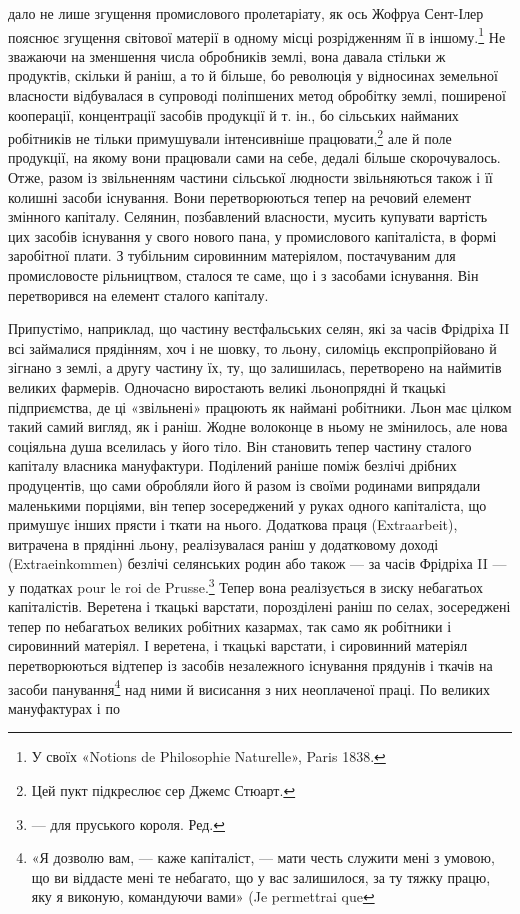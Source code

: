 \parcont{}  %
дало не лише згущення промислового пролетаріату, як ось Жофруа
Сент-Ілер пояснює згущення світової матерії в одному
місці розрідженням її в іншому.\footnote{
У своїх «Notions de Philosophie Naturelle», Paris 1838.
} Не зважаючи на зменшення
числа обробників землі, вона давала стільки ж продуктів, скільки
й раніш, а то й більше, бо революція у відносинах земельної
власности відбувалася в супроводі поліпшених метод обробітку
землі, поширеної кооперації, концентрації засобів продукції й
т. ін., бо сільських найманих робітників не тільки примушували
інтенсивніше працювати,\footnote{
Цей пукт підкреслює сер Джемс Стюарт.
} але й поле продукції, на якому
вони працювали сами на себе, дедалі більше скорочувалось.
Отже, разом із звільненням частини сільської людности звільняються
також і її колишні засоби існування. Вони перетворюються
тепер на речовий елемент змінного капіталу. Селянин,
позбавлений власности, мусить купувати вартість цих засобів
існування у свого нового пана, у промислового капіталіста, в
формі заробітної плати. З тубільним сировинним матеріялом,
постачуваним для промисловосте рільництвом, сталося те саме,
що і з засобами існування. Він перетворився на елемент сталого
капіталу.

Припустімо, наприклад, що частину вестфальських селян,
які за часів Фрідріха II всі займалися прядінням, хоч і не шовку,
то льону, силоміць експропрійовано й зігнано з землі, а другу
частину їх, ту, що залишилась, перетворено на наймитів великих
фармерів. Одночасно виростають великі льонопрядні й ткацькі
підприємства, де ці «звільнені» працюють як наймані робітники.
Льон має цілком такий самий вигляд, як і раніш. Жодне волоконце
в ньому не змінилось, але нова соціяльна душа вселилась
у його тіло. Він становить тепер частину сталого капіталу власника
мануфактури. Поділений раніше поміж безлічі дрібних
продуцентів, що сами обробляли його й разом із своїми родинами
випрядали маленькими порціями, він тепер зосереджений у руках
одного капіталіста, що примушує інших прясти і ткати на
нього. Додаткова праця (Extraarbeit), витрачена в прядінні
льону, реалізувалася раніш у додатковому доході (Extraeinkommen)
безлічі селянських родин або також — за часів Фрідріха
II — у податках pour le roi de Prusse.\footnote*{
— для пруського короля. Ред.
} Тепер вона реалізується
в зиску небагатьох капіталістів. Веретена і ткацькі варстати,
порозділені раніш по селах, зосереджені тепер по небагатьох
великих робітних казармах, так само як робітники і сировинний
матеріял. І веретена, і ткацькі варстати, і сировинний
матеріял перетворюються відтепер із засобів незалежного існування
прядунів і ткачів на засоби панування\footnote{
«Я дозволю вам, — каже капіталіст, — мати честь служити мені
з умовою, що ви віддасте мені те небагато, що у вас залишилося, за ту
тяжку працю, яку я виконую, командуючи вами» (Je permettrai que
} над ними й висисання
з них неоплаченої праці. По великих мануфактурах і по
\parbreak{}  %
